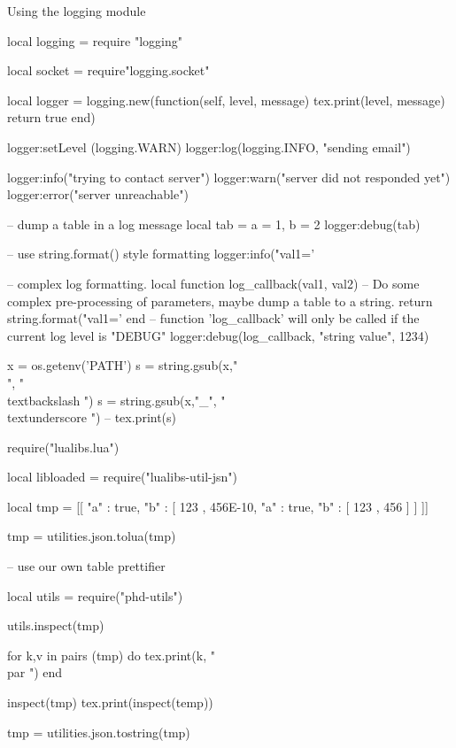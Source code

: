  
\begin{texexample}{Using the logging module}{}
\begin{luacode}
local logging = require "logging"

local socket = require"logging.socket"

local logger = logging.new(function(self, level, message)
                             tex.print(level, message)
                             return true
                           end)
                           
logger:setLevel (logging.WARN)
logger:log(logging.INFO, "sending email")

logger:info("trying to contact server")
logger:warn("server did not responded yet")
logger:error("server unreachable")

-- dump a table in a log message
local tab = { a = 1, b = 2 }
logger:debug(tab)

-- use string.format() style formatting
logger:info("val1='%

-- complex log formatting.
local function log_callback(val1, val2)
	-- Do some complex pre-processing of parameters, maybe dump a table to a string.
	return string.format("val1='%
end
-- function 'log_callback' will only be called if the current log level is "DEBUG"
logger:debug(log_callback, "string value", 1234)

x = os.getenv('PATH')
s = string.gsub(x,"\\", "\\textbackslash ")
s = string.gsub(x,"_", "\\textunderscore ")
-- tex.print(s)

require("lualibs.lua")

local libloaded = require("lualibs-util-jsn")

local tmp = [[ { "a" : true, "b" : [ 123 , 456E-10, { "a" : true, "b" : [ 123 , 456 ] } ] } ]]

 tmp = utilities.json.tolua(tmp)
 
 
 -- use our own table prettifier
 
 local utils = require("phd-utils")
 
 utils.inspect(tmp)
 
 for k,v in pairs (tmp) do
    tex.print(k, " \\par ")
 end
 
inspect(tmp)
tex.print(inspect(temp))

tmp = utilities.json.tostring(tmp)


\end{luacode}
\end{texexample}

